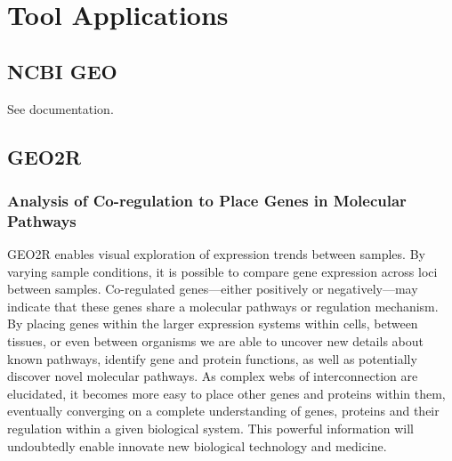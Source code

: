 \section{Tool Applications}

    \subsection{NCBI GEO}

    See documentation.\autocite{B20}

    \subsection{GEO2R}

        \subsubsection{Analysis of Co-regulation to Place Genes in Molecular Pathways}

        GEO2R enables visual exploration of expression trends between samples. By varying sample conditions, it is possible to compare gene expression across loci between samples.\autocite{L9} Co-regulated genes---either positively or negatively---may indicate that these genes share a molecular pathways or regulation mechanism.\autocite{L9} By placing genes within the larger expression systems within cells, between tissues, or even between organisms we are able to uncover new details about known pathways, identify gene and protein functions, as well as potentially discover novel molecular pathways. As complex webs of interconnection are elucidated, it becomes more easy to place other genes and proteins within them, eventually converging on a complete understanding of genes, proteins and their regulation within a given biological system. This powerful information will undoubtedly enable innovate new biological technology and medicine.